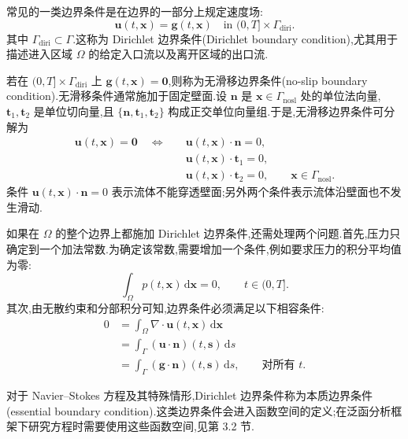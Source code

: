 \begin{note}\label{note:dirichlet-no-slip-essential}
常见的一类边界条件是在边界的一部分上规定速度场:
\begin{equation*}
  \bm{u}(t,\bm{x})=\bm{g}(t,\bm{x})
  \quad\text{in }(0,T]\times\Gamma_{\mathrm{diri}}.
\end{equation*}
其中 $\Gamma_{\mathrm{diri}}\subset\Gamma$.这称为 Dirichlet 边界条件(Dirichlet boundary condition),尤其用于描述进入区域 $\Omega$ 的给定入口流以及离开区域的出口流.

若在 $(0,T]\times\Gamma_{\mathrm{diri}}$ 上 $\bm{g}(t,\bm{x})=\bm{0}$,则称为无滑移边界条件(no-slip boundary condition).无滑移条件通常施加于固定壁面.设 $\bm{n}$ 是 $\bm{x}\in\Gamma_{\mathrm{nosl}}$ 处的单位法向量,$\bm{t}_1,\bm{t}_2$ 是单位切向量,且 $\{\bm{n},\bm{t}_1,\bm{t}_2\}$ 构成正交单位向量组.于是,无滑移边界条件可分解为
\begin{equation*}
\begin{aligned}
  \bm{u}(t,\bm{x})=\bm{0}
  \quad\Longleftrightarrow\quad
  &\bm{u}(t,\bm{x})\cdot\bm{n}=0,\\
  &\bm{u}(t,\bm{x})\cdot\bm{t}_1=0,\\
  &\bm{u}(t,\bm{x})\cdot\bm{t}_2=0,
   \qquad \bm{x}\in\Gamma_{\mathrm{nosl}}.
\end{aligned}
\end{equation*}
条件 $\bm{u}(t,\bm{x})\cdot\bm{n}=0$ 表示流体不能穿透壁面;另外两个条件表示流体沿壁面也不发生滑动.

如果在 $\Omega$ 的整个边界上都施加 Dirichlet 边界条件,还需处理两个问题.首先,压力只确定到一个加法常数.为确定该常数,需要增加一个条件,例如要求压力的积分平均值为零:
\begin{equation*}
  \int_{\Omega}p(t,\bm{x})\,\mathrm{d}\bm{x}=0,
  \qquad t\in(0,T].
\end{equation*}
其次,由无散约束和分部积分可知,边界条件必须满足以下相容条件:
\begin{equation}\label{eq:dirichlet-flux-compatibility}
\begin{aligned}
  0&=\int_{\Omega}\nabla\cdot\bm{u}(t,\bm{x})\,\mathrm{d}\bm{x}\\
   &=\int_{\Gamma}(\bm{u}\cdot\bm{n})(t,\bm{s})\,\mathrm{d}s\\
   &=\int_{\Gamma}(\bm{g}\cdot\bm{n})(t,\bm{s})\,\mathrm{d}s,
  \qquad\text{对所有 }t.
\end{aligned}
\end{equation}

对于 Navier--Stokes 方程及其特殊情形,Dirichlet 边界条件称为本质边界条件(essential boundary condition).这类边界条件会进入函数空间的定义;在泛函分析框架下研究方程时需要使用这些函数空间,见第 3.2 节.
\end{note}

